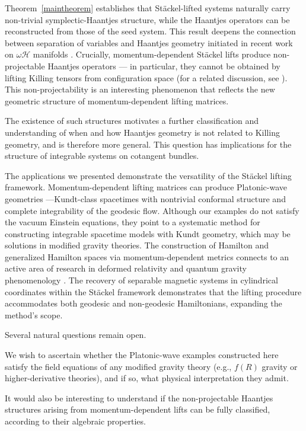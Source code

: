 \documentclass[10pt]{amsart}
\numberwithin{equation}{section}
\theoremstyle{definition}
\begin{document}
Theorem~\ref{maintheorem} establishes that Stäckel-lifted systems naturally carry non-trivial symplectic-Haantjes structure, while the Haantjes operators can be reconstructed from those of the seed system. This result deepens the connection between separation of variables and Haantjes geometry initiated in recent work on $\omega\mathscr{H}$ manifolds \cite{TT2021JGP,TT2022AMPA,RTT2022CNS,RTT2024AMPA}. Crucially, momentum-dependent Stäckel lifts produce non-projectable Haantjes operators — in particular, they cannot be obtained by lifting Killing tensors from configuration space (for a related discussion, see \cite{BKM2025stackel,BKM2026duality}). This non-projectability is an interesting phenomenon that reflects the new geometric structure of momentum-dependent lifting matrices.

The existence of such structures motivates a further classification and understanding of when and how Haantjes geometry is not related to Killing geometry, and is therefore more general. This question has implications for the structure of integrable systems on cotangent bundles.

The applications we presented demonstrate the versatility of the Stäckel lifting framework. Momentum-dependent lifting matrices can produce Platonic-wave geometries \cite{BM2013PRD}---Kundt-class spacetimes with nontrivial conformal structure and complete integrability of the geodesic flow. Although our examples do not satisfy the vacuum Einstein equations, they point to a systematic method for constructing integrable spacetime models with Kundt geometry, which may be solutions in modified gravity theories. The construction of Hamilton and generalized Hamilton spaces via momentum-dependent metrics connects to an active area of research in deformed relativity and quantum gravity phenomenology \cite{Miron2001,Voicu2021,RSS2024,BBGLP2015PRD,CLR2022PRD,Albuquerque}. The recovery of separable magnetic systems in cylindrical coordinates within the Stäckel framework \cite{KRTT2024PRA} demonstrates that the lifting procedure accommodates both geodesic and non-geodesic Hamiltonians, expanding the method's scope.

Several natural questions remain open.

We wish to ascertain whether the Platonic-wave examples constructed here satisfy the field equations of any modified gravity theory (e.g., $f(R)$ gravity or higher-derivative theories), and if so, what physical interpretation they admit.  

It would also be interesting to understand if the non-projectable Haantjes structures arising from momentum-dependent lifts can be fully classified, according to their algebraic properties. 
\end{document}
